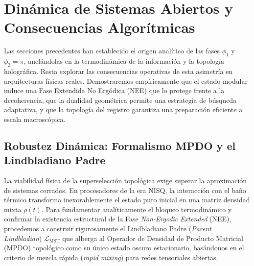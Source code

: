 \documentclass[12pt,a4paper]{article}
\theoremstyle{plain}
\theoremstyle{definition}
\theoremstyle{remark}
\begin{document}
\section{Dinámica de Sistemas Abiertos y Consecuencias Algorítmicas}
\label{sec:consecuencias}

Las secciones precedentes han establecido el origen analítico de las fases $\phi_1$ y $\phi_2 = \pi$, anclándolas en la termodinámica de la información y la topología holográfica. Resta explorar las consecuencias operativas de esta asimetría en arquitecturas físicas reales. Demostraremos empíricamente que el estado modular induce una Fase Extendida No Ergódica (NEE) que lo protege frente a la decoherencia, que la dualidad geométrica permite una estrategia de búsqueda adaptativa, y que la topología del registro garantiza una preparación eficiente a escala macroscópica.

\subsection{Robustez Dinámica: Formalismo MPDO y el Lindbladiano Padre}
\label{subsec:robustez_dinamica}

La viabilidad física de la superselección topológica exige superar la aproximación de sistemas cerrados. En procesadores de la era NISQ, la interacción con el baño térmico transforma inexorablemente el estado puro inicial en una matriz densidad mixta $\rho(t)$. Para fundamentar analíticamente el bloqueo termodinámico y confirmar la existencia estructural de la Fase \textit{Non-Ergodic Extended} (NEE), procedemos a construir rigurosamente el Lindbladiano Padre (\textit{Parent Lindbladian}) $\mathcal{L}_{\text{MST}}$ que alberga al Operador de Densidad de Producto Matricial (MPDO) topológico como su único estado oscuro estacionario, basándonos en el criterio de mezcla rápida (\textit{rapid mixing}) para redes tensoriales abiertas.
\end{document}
